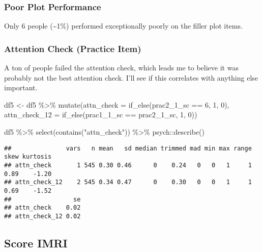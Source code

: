 \documentclass[
]{article}
\newenvironment{Shaded}{\begin{snugshade}}{\end{snugshade}}
\newcommand{\AttributeTok}[1]{\textcolor[rgb]{0.77,0.63,0.00}{#1}}
\newcommand{\DecValTok}[1]{\textcolor[rgb]{0.00,0.00,0.81}{#1}}
\newcommand{\FunctionTok}[1]{\textcolor[rgb]{0.00,0.00,0.00}{#1}}
\newcommand{\NormalTok}[1]{#1}
\newcommand{\OtherTok}[1]{\textcolor[rgb]{0.56,0.35,0.01}{#1}}
\newcommand{\SpecialCharTok}[1]{\textcolor[rgb]{0.00,0.00,0.00}{#1}}
\newcommand{\StringTok}[1]{\textcolor[rgb]{0.31,0.60,0.02}{#1}}
\begin{document}
\hypertarget{poor-plot-performance}{%
\subsubsection{Poor Plot Performance}\label{poor-plot-performance}}

Only 6 people (\textasciitilde1\%) performed exceptionally poorly on the
filler plot items.

\hypertarget{attention-check-practice-item}{%
\subsubsection{Attention Check (Practice
Item)}\label{attention-check-practice-item}}

A ton of people failed the attention check, which leads me to believe it
was probably not the best attention check. I'll see if this correlates
with anything else important.

\begin{Shaded}
\begin{Highlighting}[]
\NormalTok{df5 }\OtherTok{\textless{}{-}}\NormalTok{ df5 }\SpecialCharTok{\%\textgreater{}\%} 
  \FunctionTok{mutate}\NormalTok{(}\AttributeTok{attn\_check =} \FunctionTok{if\_else}\NormalTok{(prac2\_1\_sc }\SpecialCharTok{==} \DecValTok{6}\NormalTok{, }\DecValTok{1}\NormalTok{, }\DecValTok{0}\NormalTok{),}
         \AttributeTok{attn\_check\_12 =} \FunctionTok{if\_else}\NormalTok{(prac1\_1\_sc }\SpecialCharTok{==}\NormalTok{ prac2\_1\_sc, }\DecValTok{1}\NormalTok{, }\DecValTok{0}\NormalTok{))}

\NormalTok{df5 }\SpecialCharTok{\%\textgreater{}\%} 
  \FunctionTok{select}\NormalTok{(}\FunctionTok{contains}\NormalTok{(}\StringTok{"attn\_check"}\NormalTok{)) }\SpecialCharTok{\%\textgreater{}\%} 
\NormalTok{  psych}\SpecialCharTok{::}\FunctionTok{describe}\NormalTok{()}
\end{Highlighting}
\end{Shaded}

\begin{verbatim}
##               vars   n mean   sd median trimmed mad min max range skew kurtosis
## attn_check       1 545 0.30 0.46      0    0.24   0   0   1     1 0.89    -1.20
## attn_check_12    2 545 0.34 0.47      0    0.30   0   0   1     1 0.69    -1.52
##                 se
## attn_check    0.02
## attn_check_12 0.02
\end{verbatim}

\hypertarget{score-imri}{%
\subsection{Score IMRI}\label{score-imri}}
\end{document}
